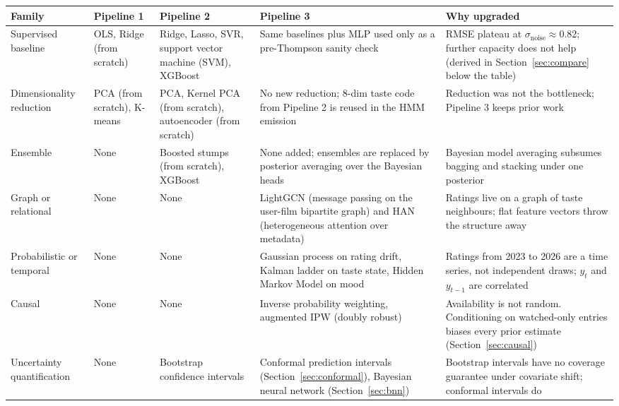\documentclass{article}
\begin{document}
\begin{table}[!htbp]
\centering
\scriptsize
\setlength{\tabcolsep}{4pt}
\renewcommand{\arraystretch}{1.1}
\begin{tabular}{>{\raggedright\arraybackslash}p{2.4cm}>{\raggedright\arraybackslash}p{2.7cm}>{\raggedright\arraybackslash}p{2.7cm}>{\raggedright\arraybackslash}p{2.8cm}>{\raggedright\arraybackslash}p{3.0cm}}
\toprule
\textbf{Family} & \textbf{Pipeline 1} & \textbf{Pipeline 2} & \textbf{Pipeline 3} & \textbf{Why upgraded} \\
\midrule
Supervised baseline & OLS, Ridge (from scratch) & Ridge, Lasso, SVR, support vector machine (SVM), XGBoost & Same baselines plus MLP used only as a pre-Thompson sanity check & RMSE plateau at $\sigma_{\text{noise}} \approx 0.82$; further capacity does not help (derived in Section~\ref{sec:compare} below the table) \\
Dimensionality reduction & PCA (from scratch), K-means & PCA, Kernel PCA (from scratch), autoencoder (from scratch) & No new reduction; 8-dim taste code from Pipeline 2 is reused in the HMM emission & Reduction was not the bottleneck; Pipeline 3 keeps prior work \\
Ensemble & None & Boosted stumps (from scratch), XGBoost & None added; ensembles are replaced by posterior averaging over the Bayesian heads & Bayesian model averaging subsumes bagging and stacking under one posterior \\
Graph or relational & None & None & LightGCN (message passing on the user-film bipartite graph) and HAN (heterogeneous attention over metadata) & Ratings live on a graph of taste neighbours; flat feature vectors throw the structure away \\
Probabilistic or temporal & None & None & Gaussian process on rating drift, Kalman ladder on taste state, Hidden Markov Model on mood & Ratings from 2023 to 2026 are a time series, not independent draws; $y_t$ and $y_{t-1}$ are correlated \\
Causal & None & None & Inverse probability weighting, augmented IPW (doubly robust) & Availability is not random. Conditioning on watched-only entries biases every prior estimate (Section~\ref{sec:causal}) \\
Uncertainty quantification & None & Bootstrap confidence intervals & Conformal prediction intervals (Section~\ref{sec:conformal}), Bayesian neural network (Section~\ref{sec:bnn}) & Bootstrap intervals have no coverage guarantee under covariate shift; conformal intervals do \\

\end{tabular}
\end{table}
\end{document}
